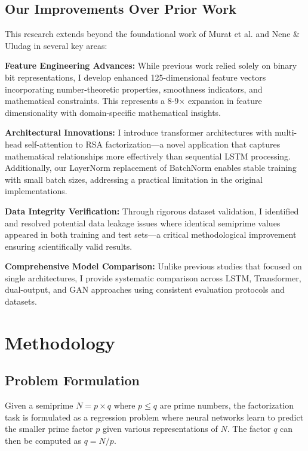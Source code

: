 \documentclass[12pt]{article}
\begin{document}
\subsection{Our Improvements Over Prior Work}

This research extends beyond the foundational work of Murat et al. and Nene \& Uludag in several key areas:

\textbf{Feature Engineering Advances:} While previous work relied solely on binary bit representations, I develop enhanced 125-dimensional feature vectors incorporating number-theoretic properties, smoothness indicators, and mathematical constraints. This represents a 8-9× expansion in feature dimensionality with domain-specific mathematical insights.

\textbf{Architectural Innovations:} I introduce transformer architectures with multi-head self-attention to RSA factorization—a novel application that captures mathematical relationships more effectively than sequential LSTM processing. Additionally, our LayerNorm replacement of BatchNorm enables stable training with small batch sizes, addressing a practical limitation in the original implementations.

\textbf{Data Integrity Verification:} Through rigorous dataset validation, I identified and resolved potential data leakage issues where identical semiprime values appeared in both training and test sets—a critical methodological improvement ensuring scientifically valid results.

\textbf{Comprehensive Model Comparison:} Unlike previous studies that focused on single architectures, I provide systematic comparison across LSTM, Transformer, dual-output, and GAN approaches using consistent evaluation protocols and datasets.

\section{Methodology}

\subsection{Problem Formulation}

Given a semiprime $N = p \times q$ where $p \leq q$ are prime numbers, the factorization task is formulated as a regression problem where neural networks learn to predict the smaller prime factor $p$ given various representations of $N$. The factor $q$ can then be computed as $q = N/p$.
\end{document}
